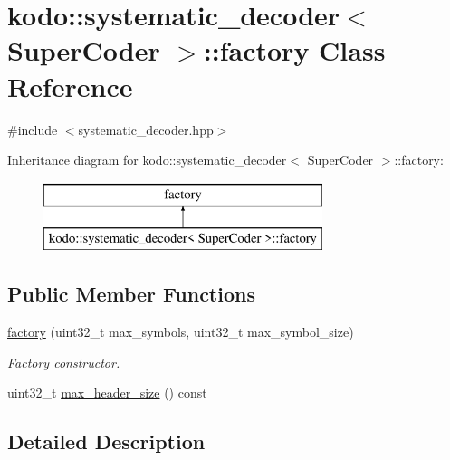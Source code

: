 \hypertarget{classkodo_1_1systematic__decoder_1_1factory}{\section{kodo\-:\-:systematic\-\_\-decoder$<$ Super\-Coder $>$\-:\-:factory Class Reference}
\label{classkodo_1_1systematic__decoder_1_1factory}
}


{\ttfamily \#include $<$systematic\-\_\-decoder.\-hpp$>$}

Inheritance diagram for kodo\-:\-:systematic\-\_\-decoder$<$ Super\-Coder $>$\-:\-:factory\-:\begin{figure}[H]
\begin{center}
\leavevmode
\includegraphics[height=2.000000cm]{classkodo_1_1systematic__decoder_1_1factory}
\end{center}
\end{figure}
\subsection*{Public Member Functions}
\begin{DoxyCompactItemize}
\item 
\hyperlink{classkodo_1_1systematic__decoder_1_1factory_af7ec61910162b31620f92e8f9ed6aae4}{factory} (uint32\-\_\-t max\-\_\-symbols, uint32\-\_\-t max\-\_\-symbol\-\_\-size)
\begin{DoxyCompactList}\small\item\em Factory constructor. \end{DoxyCompactList}\item 
uint32\-\_\-t \hyperlink{classkodo_1_1systematic__decoder_1_1factory_a624ac32f6b04c55e489e091f2ac204f1}{max\-\_\-header\-\_\-size} () const 
\begin{DoxyCompactList}\small\item\em \end{DoxyCompactList}\end{DoxyCompactItemize}


\subsection{Detailed Description}
